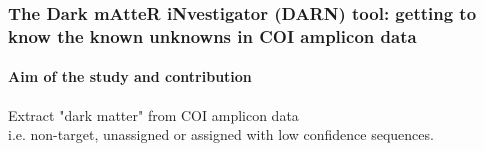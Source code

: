 \documentclass{beamer}
\begin{document}
   \begin{darkframes}
      \begin{frame}
         \frametitle{The Dark mAtteR iNvestigator (DARN) tool: getting to know
         the known unknowns in COI amplicon data}
         \framesubtitle{Aim of the study and contribution}


         Extract "dark matter"
         from COI amplicon data  \\
         i.e. non-target, unassigned or assigned with low confidence sequences.
      \end{frame}
   \end{darkframes}
\end{document}
